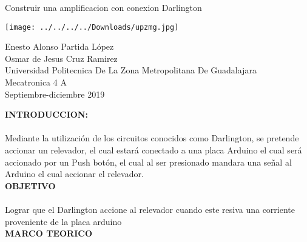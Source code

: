 \documentclass[12pt]{report}
\begin{document}
 
\begin{center}
{\Huge Construir una amplificacion con conexion Darlington}
\end{center}
\begin{center}
\texttt{[image: ../../../../Downloads/upzmg.jpg]} 
\end{center} 
{\Huge Enesto Alonso Partida López\\Osmar de Jesus Cruz Ramirez\\ Universidad Politecnica De La Zona Metropolitana De Guadalajara\\ Mecatronica 4 A\\ Septiembre-diciembre 2019}
\date{ 5 de noviembre  2019}
 
\newpage

{\huge \textbf{INTRODUCCION:}\\}\\


{\large Mediante la utilización de los circuitos conocidos como Darlington, se pretende accionar un relevador, el cual estará conectado a una placa Arduino el cual será accionado por un  Push botón, el cual al ser presionado mandara una señal  al Arduino el cual accionar el relevador.}\\
 

{\huge \textbf{OBJETIVO}\\}\\


{\large Lograr que el Darlington accione al relevador cuando este resiva una corriente proveniente de la placa arduino}\\



{\huge \textbf{MARCO TEORICO}\\}\\
\end{document}
